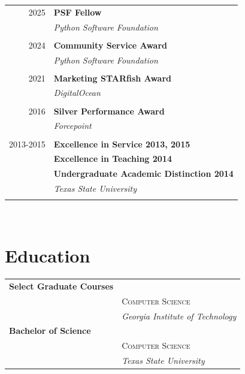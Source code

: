 \documentclass[10pt]{article} %
\begin{document}
\begin{minipage}[t]{0.44\textwidth}
\begin{tabular}{rl}
2025     & \textbf{PSF Fellow}\\
    & \textit{Python Software Foundation} \\\\

2024     & \textbf{Community Service Award}\\
    & \textit{Python Software Foundation} \\\\

2021     & \textbf{Marketing STARfish Award}\\
& \textit{DigitalOcean} \\\\

2016     & \textbf{Silver Performance Award}\\
& \textit{Forcepoint}\\ \\

2013-2015     & \textbf{Excellence in Service 2013, 2015}\\
& \textbf{Excellence in Teaching 2014}\\
& \textbf{Undergraduate Academic Distinction 2014}\\
& \textit{Texas State University}\\\\

\end{tabular}\\



\section{Education} 

\begin{tabular}{ll} %

\textbf{Select Graduate Courses} \\ 
& \textsc{Computer Science} \\ 
& \textit{Georgia Institute of Technology}\\


\textbf{Bachelor of Science} \\ 
& \textsc{Computer Science} \\ 
& \textit{Texas State University}\\


\end{tabular}
\end{minipage}
\end{document}
